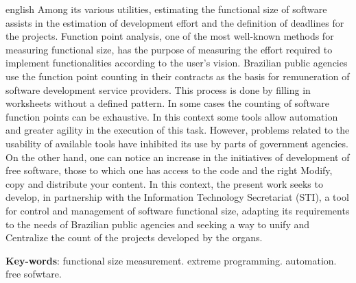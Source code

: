 \begin{resumo}[Abstract]
 \begin{otherlanguage*}{english}
  Among its various utilities, estimating the functional size of software assists in the estimation of development effort and the definition of deadlines for the projects. Function point analysis, one of the most well-known methods for measuring functional size, has the purpose of measuring the effort required to implement functionalities according to the user's vision. Brazilian public agencies use the function point counting in their contracts as the basis for remuneration of software development service providers. This process is done by filling in worksheets without a defined pattern. In some cases the counting of software function points can be exhaustive. In this context some tools allow automation and greater agility in the execution of this task. However, problems related to the usability of available tools have inhibited its use by parts of government agencies. On the other hand, one can notice an increase in the initiatives of development of free software, those to which one has access to the code and the right Modify, copy and distribute your content. In this context, the present work seeks to develop, in partnership with the Information Technology Secretariat (STI), a tool for control and management of software functional size, adapting its requirements to the needs of Brazilian public agencies and seeking a way to unify and Centralize the count of the projects developed by the organs.

   \vspace{\onelineskip}

   \noindent
   \textbf{Key-words}: functional size measurement. extreme programming. automation. free sofwtare.
 \end{otherlanguage*}
\end{resumo}
